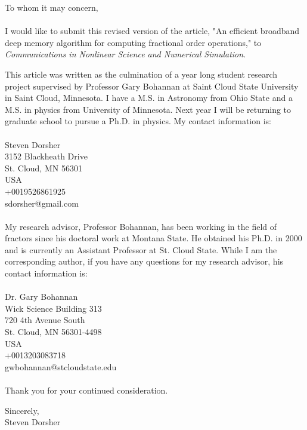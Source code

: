 \documentclass[12pt]{letter}
\begin{document}
\noindent To whom it may concern,
\\
\\
I would like to submit this revised version of the article,  "An efficient broadband deep memory algorithm for computing fractional order operations," to {\em Communications in Nonlinear Science and Numerical Simulation}.

This article was written as the culmination of a year long student research project supervised by Professor Gary Bohannan at Saint Cloud State University in Saint Cloud, Minnesota. I have a M.S. in Astronomy from Ohio State and a M.S. in physics from University of Minnesota. Next year I will be returning to graduate school to pursue a Ph.D. in physics. My contact information is:
\\
\\
\noindent Steven Dorsher\\
3152 Blackheath Drive\\
St. Cloud, MN 56301\\
USA\\
+0019526861925\\
sdorsher@gmail.com\\
\\
My research advisor, Professor Bohannan, has been working in the field of fractors since his doctoral work at Montana State. He obtained his Ph.D. in 2000 and is currently an Assistant Professor at St. Cloud State. While I am the corresponding author, if you have any questions for my research advisor, his contact information is:
\\
\\
\noindent Dr. Gary Bohannan\\
Wick Science Building 313\\
720 4th Avenue South\\
St. Cloud, MN 56301-4498\\
USA\\
+0013203083718\\
gwbohannan@stcloudstate.edu\\
\\
Thank you for your continued consideration.

\noindent Sincerely,\\
Steven Dorsher
\end{document}
